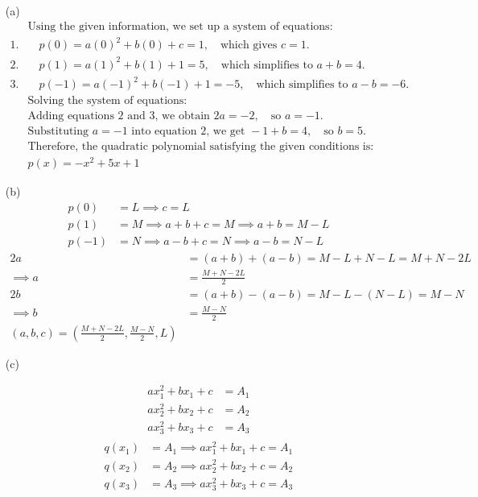 \documentclass{report}
\begin{document}
\sol 

\begin{enumerate}

\item[(a)]  
\begin{align*}
& \text{Using the given information, we set up a system of equations:} \\
1. & \quad p(0) = a(0)^2 + b(0) + c = 1, \quad \text{which gives } c = 1. \\
2. & \quad p(1) = a(1)^2 + b(1) + 1 = 5, \quad \text{which simplifies to } a + b = 4. \\
3. & \quad p(-1) = a(-1)^2 + b(-1) + 1 = -5, \quad \text{which simplifies to } a - b = -6. \\
& \text{Solving the system of equations:} \\
& \text{Adding equations 2 and 3, we obtain } 2a = -2, \quad \text{so } a = -1. \\
& \text{Substituting } a = -1 \text{ into equation 2, we get } -1 + b = 4, \quad \text{so } b = 5. \\
& \text{Therefore, the quadratic polynomial satisfying the given conditions is:} \\
& \boxed{p(x) = -x^2 + 5x + 1}
\end{align*}
\item[(b)]
\begin{align*}
p(0) &= L \implies c = L \\
p(1) &= M \implies a + b + c = M \implies a + b = M - L \\
p(-1) &= N \implies a - b + c = N \implies a - b = N - L
\end{align*}
\begin{align*}
2a &= (a + b) + (a - b) = M - L + N - L = M + N - 2L \\
\implies a &= \frac{M + N - 2L}{2} \\
2b &= (a + b) - (a - b) = M - L - (N - L) = M - N \\
\implies b &= \frac{M - N}{2} \\
\boxed{(a,b,c) = (\frac{M + N - 2L}{2},\frac{M - N}{2},L)}
\end{align*}


\item[(c)]

\begin{align*}
ax_1^2 + bx_1 + c &= A_1 \\
ax_2^2 + bx_2 + c &= A_2 \\
ax_3^2 + bx_3 + c &= A_3
\end{align*}
\begin{align*}
\boxed{
\begin{array}{ccc}
q(x_1) &= A_1 \implies ax_1^2 + bx_1 + c = A_1 \\
q(x_2) &= A_2 \implies ax_2^2 + bx_2 + c = A_2 \\
q(x_3) &= A_3 \implies ax_3^2 + bx_3 + c = A_3
\end{array}
}
\end{align*}

\end{enumerate}
\end{document}
